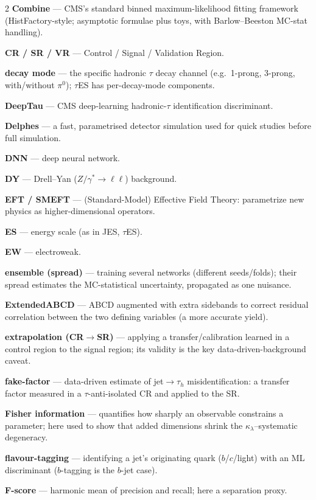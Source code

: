 \documentclass[11pt]{article}
\newcommand{\kl}{\ensuremath{\kappa_\lambda}}
\begin{document}
{\begin{multicols}{2}
\textbf{Combine} --- CMS's standard binned maximum-likelihood fitting framework (HistFactory-style; asymptotic formulae plus toys, with Barlow--Beeston MC-stat handling).

\textbf{CR / SR / VR} --- Control / Signal / Validation Region.

\textbf{decay mode} --- the specific hadronic $\tau$ decay channel (e.g.\ 1-prong, 3-prong, with/without $\pi^0$); $\tau$ES has per-decay-mode components.

\textbf{DeepTau} --- CMS deep-learning hadronic-$\tau$ identification discriminant.

\textbf{Delphes} --- a fast, parametrised detector simulation used for quick studies before full simulation.

\textbf{DNN} --- deep neural network.

\textbf{DY} --- Drell--Yan ($Z/\gamma^*\to\ell\ell$) background.

\textbf{EFT / SMEFT} --- (Standard-Model) Effective Field Theory: parametrize new physics as higher-dimensional operators.

\textbf{ES} --- energy scale (as in JES, $\tau$ES).

\textbf{EW} --- electroweak.

\textbf{ensemble (spread)} --- training several networks (different seeds/folds); their spread estimates the MC-statistical uncertainty, propagated as one nuisance.

\textbf{ExtendedABCD} --- ABCD augmented with extra sidebands to correct residual correlation between the two defining variables (a more accurate yield).

\textbf{extrapolation (CR$\to$SR)} --- applying a transfer/calibration learned in a control region to the signal region; its validity is the key data-driven-background caveat.

\textbf{fake-factor} --- data-driven estimate of jet$\to\tau_h$ misidentification: a transfer factor measured in a $\tau$-anti-isolated CR and applied to the SR.

\textbf{Fisher information} --- quantifies how sharply an observable constrains a parameter; here used to show that added dimensions shrink the \kl--systematic degeneracy.

\textbf{flavour-tagging} --- identifying a jet's originating quark ($b$/$c$/light) with an ML discriminant ($b$-tagging is the $b$-jet case).

\textbf{F-score} --- harmonic mean of precision and recall; here a separation proxy.


\end{multicols}}
\end{document}

